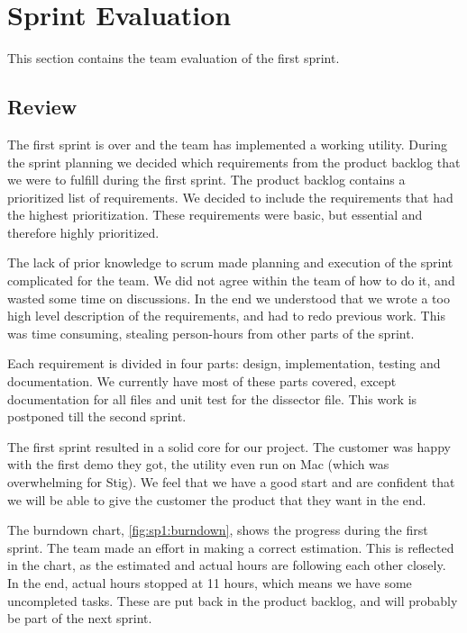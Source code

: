 \section{Sprint Evaluation}
\label{sec:sp1:eval}
This section contains the team evaluation of the first sprint.

\subsection{Review}
The first sprint is over and the team has implemented a working \gls{utility}. During
the sprint planning we decided which requirements from the product backlog that
we were to fulfill during the first sprint. The product backlog contains a
prioritized list of requirements. We decided to include the requirements that
had the highest prioritization. These requirements were basic, but essential
and therefore highly prioritized.
   
The lack of prior knowledge to \Gls{scrum} made planning and execution of the sprint
complicated for the team. We did not agree within the team of how to do it, and
wasted some time on discussions. In the end we understood
that we wrote a too high level description of the requirements, and had to redo
previous work. This was time consuming, stealing person-hours from other parts
of the sprint.

Each requirement is divided in four parts: design, implementation, testing and
documentation. We currently have most of these parts covered, except
documentation for all files and unit test for the \gls{dissector} file. This work is
postponed till the second sprint.

The first sprint resulted in a solid core for our project. The customer was
happy with the first demo they got, the \gls{utility} even run on Mac (which was
overwhelming for Stig). We feel that we have a good start and are confident
that we will be able to give the customer the product that they want in the
end.

The burndown chart, \autoref{fig:sp1:burndown}, shows the progress during
the first sprint. The team made an effort in making a correct estimation. This
is reflected in the chart, as the estimated and actual hours are  following
each other closely. In the end, actual hours stopped at 11 hours, which means we
have some uncompleted tasks. These are put back in the product backlog, and will
probably be part of the next sprint. 

